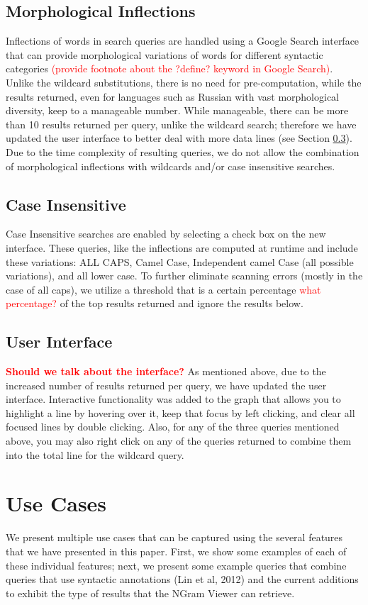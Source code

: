 \documentclass[11pt]{article}
\begin{document}
\subsection{Morphological Inflections}
Inflections of words in search queries are handled using a Google Search interface that can provide morphological variations of words for different syntactic categories \textcolor{red}{(provide footnote about the ?define? keyword in Google Search)}. Unlike the wildcard substitutions, there is no need for pre-computation, while the results returned, even for languages such as Russian with vast morphological diversity, keep to a manageable number. While manageable, there can be more than 10 results returned per query, unlike the wildcard search; therefore we have updated the user interface to better deal with more data lines (see Section \ref{sec:userint}). Due to the time complexity of resulting queries, we do not allow the combination of morphological inflections with wildcards and/or case insensitive searches.

\subsection{Case Insensitive}
Case Insensitive searches are enabled by selecting a check box on the new interface. These queries, like the inflections are computed at runtime and include these variations: ALL CAPS, Camel Case, Independent camel Case (all possible variations), and all lower case. To further eliminate scanning errors (mostly in the case of all caps), we utilize a threshold that is a certain percentage \textcolor{red}{what percentage?}
of the top results returned and ignore the results below.

\subsection{User Interface}
\label{sec:userint}
\textcolor{red}{\bf Should we talk about the interface?}
As mentioned above, due to the increased number of results returned per query, we have updated the user interface. Interactive functionality was added to the graph that allows you to highlight a line by hovering over it, keep that focus by left clicking, and clear all focused lines by double clicking. Also, for any of the three queries mentioned above, you may also right click on any of the queries returned to combine them into the total line for the wildcard query.


\section{Use Cases}
\label{sec:usecases}
We present multiple use cases that can be captured using the several features that we have presented in this paper. First, we show some examples of each of these individual features; next, we present some example queries that combine queries that use syntactic annotations (Lin et al, 2012) and the current additions to exhibit the type of results that the NGram Viewer can retrieve.
\end{document}
